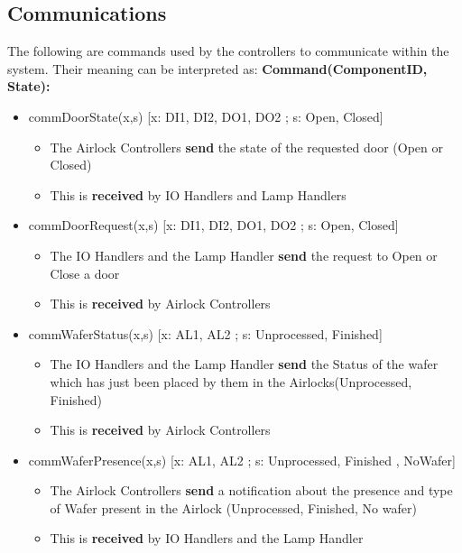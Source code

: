 \documentclass[a4paper,12pt]{article}
\begin{document}
	\subsection {Communications}
	The following are commands used by the controllers to communicate within
	the system. Their meaning can be interpreted as: 
	\bigskip
	\newline
	\textbf{Command(ComponentID, State):}
	\begin{itemize}
		\item commDoorState(x,s) [x: DI1, DI2, DO1, DO2 ; s: Open, Closed] 
		\begin{itemize}
			\item The Airlock Controllers \textbf{send} the state of the requested door (Open or Closed)
			\item This is \textbf{received} by IO Handlers and Lamp Handlers
		\end{itemize}
		\bigskip
		
		\item commDoorRequest(x,s) [x: DI1, DI2, DO1, DO2 ; s: Open, Closed]
		\begin{itemize}
			\item The IO Handlers and the Lamp Handler \textbf{send} the request to Open or Close a door 
			\item This is \textbf{received} by Airlock Controllers
		\end{itemize}
		\bigskip
		
		\item commWaferStatus(x,s) [x: AL1, AL2 ; s: Unprocessed, Finished]
		\begin{itemize}
			\item The IO Handlers and the Lamp Handler \textbf{send} the Status of the wafer which has just been placed by them in the Airlocks(Unprocessed, Finished) 
			\item This is \textbf{received} by Airlock Controllers
		\end{itemize}
		\bigskip
		
		\item commWaferPresence(x,s) [x: AL1, AL2 ; s: Unprocessed, Finished , NoWafer]
		\begin{itemize}
			\item The Airlock Controllers \textbf{send} a notification about the presence and type of Wafer present in the Airlock (Unprocessed, Finished, No wafer) 
			\item This is \textbf{received} by IO Handlers and the Lamp Handler
		\end{itemize}
		

\end{itemize}
\end{document}
